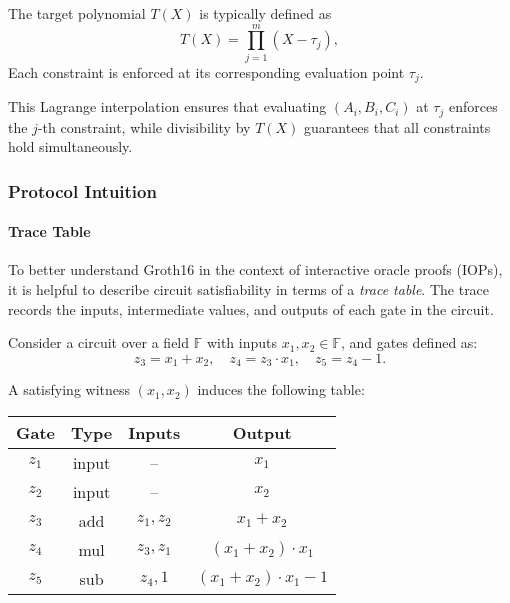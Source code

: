 The target polynomial $T(X)$ is typically defined as
\[
T(X) = \prod_{j=1}^{m} (X - \tau_j),
\]  
Each constraint is enforced at its corresponding evaluation point $\tau_j$.  

This Lagrange interpolation ensures that evaluating $(A_i,B_i,C_i)$ at $\tau_j$ enforces the $j$-th constraint, 
while divisibility by $T(X)$ guarantees that all constraints hold simultaneously.

\subsubsection*{Protocol Intuition}

\paragraph{Trace Table}
To better understand Groth16 in the context of interactive oracle proofs (IOPs), 
it is helpful to describe circuit satisfiability in terms of a \emph{trace table}.  
The trace records the inputs, intermediate values, and outputs of each gate in the circuit.  

\begin{example}
Consider a circuit over a field $\mathbb{F}$ with inputs $x_1, x_2 \in \mathbb{F}$,  
and gates defined as:
\[
z_3 = x_1 + x_2, \quad 
z_4 = z_3 \cdot x_1, \quad 
z_5 = z_4 - 1.
\]

\noindent A satisfying witness $(x_1, x_2)$ induces the following table:

\begin{center}
\begin{tabular}{c|c|c|c}
Gate & Type & Inputs & Output \\
\hline
$z_1$ & input & -- & $x_1$ \\
$z_2$ & input & -- & $x_2$ \\
$z_3$ & add   & $z_1, z_2$ & $x_1 + x_2$ \\
$z_4$ & mul   & $z_3, z_1$ & $(x_1 + x_2) \cdot x_1$ \\
$z_5$ & sub   & $z_4, 1$   & $(x_1 + x_2) \cdot x_1 - 1$
\end{tabular}
\end{center}
\end{example}

